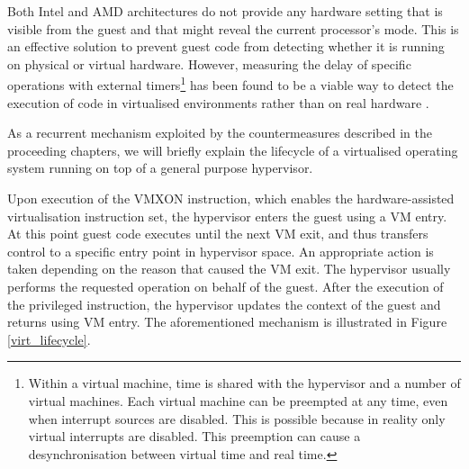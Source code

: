 
Both Intel and AMD architectures do not provide any hardware setting that is visible from the guest and that might reveal the current processor's mode. This is an effective solution to prevent guest code from detecting whether it is running on physical or virtual hardware. However, measuring the delay of specific operations with external timers\footnote{Within a virtual machine, time is shared with the hypervisor and a number of virtual machines. Each virtual machine can be preempted at any time, even when interrupt sources are disabled. This is possible because in reality only virtual interrupts are disabled. This preemption can cause a desynchronisation between virtual time and real time.} has been found to be a viable way to detect the execution of code in virtualised environments rather than on real hardware \cite{timevirt,antivirt}. 

 
As a recurrent mechanism exploited by the countermeasures described in the proceeding chapters, we will briefly explain the lifecycle of a virtualised operating system running on top of a general purpose hypervisor. %

Upon execution of the VMXON instruction, which enables the hardware-assisted virtualisation instruction set, the hypervisor enters the guest using a VM entry. At this point guest code executes until the next VM exit, and thus transfers control to a specific entry point in hypervisor space. %
An appropriate action is taken depending on the reason that caused the VM exit. The hypervisor usually performs the requested operation on behalf of the guest. After the execution of the privileged instruction, the hypervisor updates the context of the guest and returns using VM entry. The aforementioned mechanism is illustrated in Figure \ref{virt_lifecycle}. 

